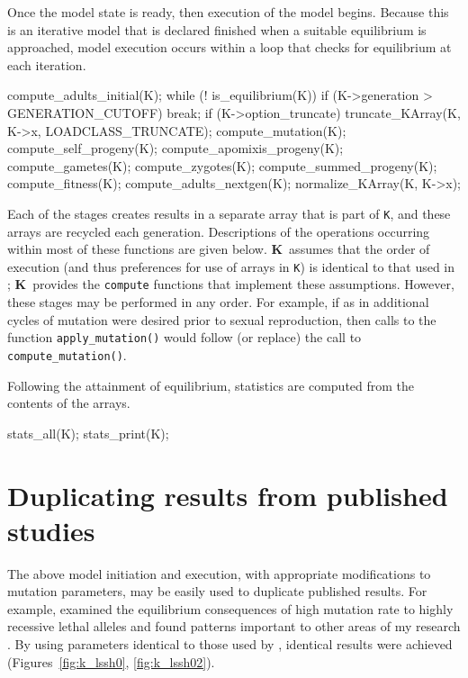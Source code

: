 \documentclass[12pt,twoside,letterpaper,fleqn]{report}
\numberwithin{equation}{section}  %
\newcommand{\K}{{\bf K}}
\newcommand{\KK}{\mbox{{\tt K}}}  %
\begin{document}
Once the model state is ready, then execution of the model begins.  Because this is an iterative model that is declared finished when a suitable equilibrium is approached, model execution occurs within a loop that checks for equilibrium at each iteration.
\begin{C}[gobble=4]
    compute_adults_initial(K);
    while (! is_equilibrium(K)) {
        if (K->generation > GENERATION_CUTOFF)
            break;
        if (K->option_truncate)
            truncate_KArray(K, K->x, LOADCLASS_TRUNCATE);
        compute_mutation(K);
        compute_self_progeny(K);
        compute_apomixis_progeny(K);
        compute_gametes(K);
        compute_zygotes(K);
        compute_summed_progeny(K);
        compute_fitness(K);
        compute_adults_nextgen(K);
        normalize_KArray(K, K->x);
    }
\end{C}
Each of the stages creates results in a separate array that is part of \KK, and these arrays are recycled each generation.  Descriptions of the operations occurring within most of these functions are given below.  \K\ assumes that the order of execution (and thus preferences for use of arrays in \KK) is identical to that used in \citet{Charlesworth:1990:5337}; \K\ provides the \lstinline{compute} functions that implement these assumptions.  However, these stages may be performed in any order.  For example, if as in \citet{Muirhead:1997:5426} additional cycles of mutation were desired prior to sexual reproduction, then calls to the function \lstinline{apply_mutation()} would follow (or replace) the call to \lstinline{compute_mutation()}.

Following the attainment of equilibrium, statistics are computed from the contents of the arrays. 
\begin{C}[gobble=4]
    stats_all(K);
    stats_print(K);
\end{C}

\section{Duplicating results from published studies}
The above model initiation and execution, with appropriate modifications to mutation parameters, may be easily used to duplicate published results.  For example, \citet{Lande:1994:5345} examined the equilibrium consequences of high mutation rate to highly recessive lethal alleles and found patterns important to other areas of my research \citet[e.g.\ ][]{Scofield:2006:10745}.  By using parameters identical to those used by \citeauthor{Lande:1994:5345}, identical results were achieved (Figures~\ref{fig:k_lssh0}, \ref{fig:k_lssh02}).
\end{document}
